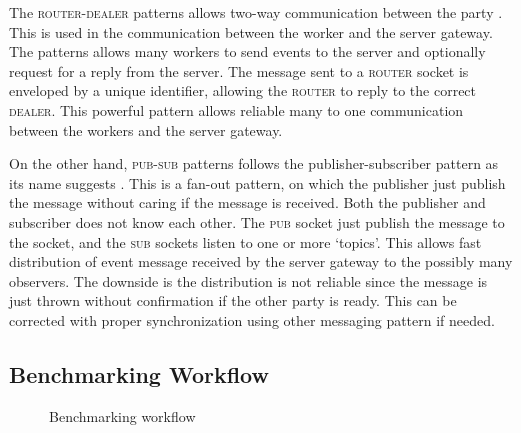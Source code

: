 The \textsc{router-dealer} patterns allows two-way communication between the party \citep{hintjens2013zeromq}.
This is used in the communication between the worker and the server gateway.
The patterns allows many workers to send events to the server and optionally request for a reply from the server.
The message sent to a \textsc{router} socket is enveloped by a unique identifier, allowing the \textsc{router} to reply to the correct \textsc{dealer}.
This powerful pattern allows reliable many to one communication between the workers and the server gateway.

On the other hand, \textsc{pub-sub} patterns follows the publisher-subscriber pattern as its name suggests \citep{hintjens2013zeromq}.
This is a fan-out pattern, on which the publisher just publish the message without caring if the message is received.
Both the publisher and subscriber does not know each other.
The \textsc{pub} socket just publish the message to the socket, and the \textsc{sub} sockets listen to one or more `topics'.
This allows fast distribution of event message received by the server gateway to the possibly many observers.
The downside is the distribution is not reliable since the message is just thrown without confirmation if the other party is ready.
This can be corrected with proper synchronization using other messaging pattern if needed.


\subsection{Benchmarking Workflow}
\begin{figure}
    \centering
    \caption{Benchmarking workflow}
    \label{fig:swimlane}
\end{figure}

